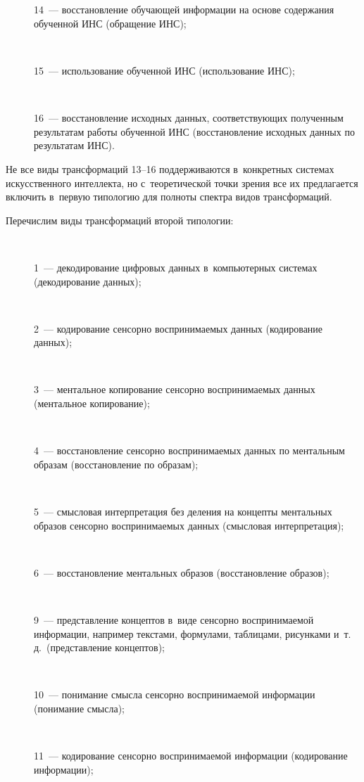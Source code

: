   \begin{figure*} %
\vspace*{1pt}
      \begin{center}
     \mbox{%
\epsfxsize=127.513mm 
}
\end{center}
\vspace*{-9pt}
\end{figure*}
  
  \begin{multicols}{2}
  
  \noindent
  \begin{description}
  \item[\,] 14~--- восстановление обучающей информации на основе 
содержания обученной ИНС (обращение ИНС);
  \item[\,] 15~--- использование обученной ИНС (использование ИНС);



  \item[\,] 16~--- восстановление исходных данных, соответствующих 
полученным результатам работы обучен\-ной ИНС (восстановление исходных данных 
по результатам ИНС).
  \end{description}
  
  
  Не все виды трансформаций 13--16 поддерживаются в~конкретных системах 
искусственного интеллекта, но с~теоретической точки зрения все их 
предлагается включить в~первую типологию для полноты спектра видов 
трансформаций.
  
  Перечислим виды трансформаций второй типологии:
  \begin{description}
  \item[\,] 1~--- декодирование цифровых данных в~компьютерных системах 
(декодирование данных);
  \item[\,]  2~--- кодирование сенсорно воспринимаемых данных (кодирование 
данных);
  \item[\,] 3~--- ментальное копирование сенсорно воспринимаемых данных 
(ментальное копирование);
  \item[\,] 4~--- восстановление сенсорно воспринимаемых данных по 
ментальным образам (восстановление по образам);
  \item[\,] 5~--- смысловая интерпретация без деления на концепты ментальных 
образов сенсорно воспринимаемых данных (смысловая интерпретация);
  \item[\,] 6~--- восстановление ментальных образов (восстановление образов);
  \item[\,] 9~--- представление концептов в~виде сенсорно воспринимаемой 
информации, например текс\-та\-ми, формулами, таблицами, рисунками и~т.\,д.\ 
(представление концептов);
  \item[\,] 10~--- понимание смысла сенсорно воспринимаемой информации 
(понимание смысла);
  \item[\,] 11~--- кодирование сенсорно воспринимаемой информации 
(кодирование информации);
\end{description}


\end{multicols}
